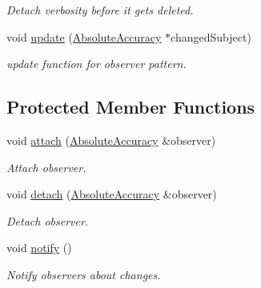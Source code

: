 \begin{DoxyCompactItemize}
\begin{DoxyCompactList}\small\item\em Detach verbosity before it gets deleted. \end{DoxyCompactList}\item 
\hypertarget{classSpacy_1_1Mixin_1_1AbsoluteAccuracy_a7e5910ba9a6ac7a4b332efdbbff27787}{}void \hyperlink{classSpacy_1_1Mixin_1_1AbsoluteAccuracy_a7e5910ba9a6ac7a4b332efdbbff27787}{update} (\hyperlink{classSpacy_1_1Mixin_1_1AbsoluteAccuracy}{Absolute\+Accuracy} $\ast$changed\+Subject)\label{classSpacy_1_1Mixin_1_1AbsoluteAccuracy_a7e5910ba9a6ac7a4b332efdbbff27787}

\begin{DoxyCompactList}\small\item\em update function for observer pattern. \end{DoxyCompactList}\end{DoxyCompactItemize}
\subsection*{Protected Member Functions}
\begin{DoxyCompactItemize}
\item 
\hypertarget{classSpacy_1_1Mixin_1_1MixinConnection_abb5520ee6b22dd993d78f142939a1ed4}{}void \hyperlink{classSpacy_1_1Mixin_1_1MixinConnection_abb5520ee6b22dd993d78f142939a1ed4}{attach} (\hyperlink{classSpacy_1_1Mixin_1_1AbsoluteAccuracy}{Absolute\+Accuracy} \&observer)\label{classSpacy_1_1Mixin_1_1MixinConnection_abb5520ee6b22dd993d78f142939a1ed4}

\begin{DoxyCompactList}\small\item\em Attach observer. \end{DoxyCompactList}\item 
\hypertarget{classSpacy_1_1Mixin_1_1MixinConnection_adda739590c487679c26f60e50aedb73f}{}void \hyperlink{classSpacy_1_1Mixin_1_1MixinConnection_adda739590c487679c26f60e50aedb73f}{detach} (\hyperlink{classSpacy_1_1Mixin_1_1AbsoluteAccuracy}{Absolute\+Accuracy} \&observer)\label{classSpacy_1_1Mixin_1_1MixinConnection_adda739590c487679c26f60e50aedb73f}

\begin{DoxyCompactList}\small\item\em Detach observer. \end{DoxyCompactList}\item 
\hypertarget{classSpacy_1_1Mixin_1_1MixinConnection_a1ddeaa78a3bb4a38c2cca36d1f99fe36}{}void \hyperlink{classSpacy_1_1Mixin_1_1MixinConnection_a1ddeaa78a3bb4a38c2cca36d1f99fe36}{notify} ()\label{classSpacy_1_1Mixin_1_1MixinConnection_a1ddeaa78a3bb4a38c2cca36d1f99fe36}

\begin{DoxyCompactList}\small\item\em Notify observers about changes. \end{DoxyCompactList}\end{DoxyCompactItemize}


